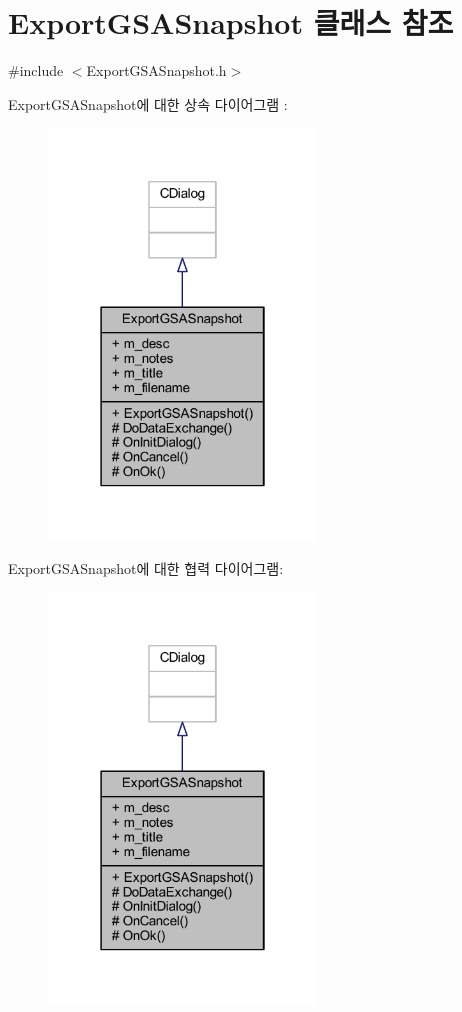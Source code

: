 \hypertarget{class_export_g_s_a_snapshot}{}\section{Export\+G\+S\+A\+Snapshot 클래스 참조}
\label{class_export_g_s_a_snapshot}


{\ttfamily \#include $<$Export\+G\+S\+A\+Snapshot.\+h$>$}



Export\+G\+S\+A\+Snapshot에 대한 상속 다이어그램 \+: \nopagebreak
\begin{figure}[H]
\begin{center}
\leavevmode
\includegraphics[width=202pt]{class_export_g_s_a_snapshot__inherit__graph}
\end{center}
\end{figure}


Export\+G\+S\+A\+Snapshot에 대한 협력 다이어그램\+:\nopagebreak
\begin{figure}[H]
\begin{center}
\leavevmode
\includegraphics[width=202pt]{class_export_g_s_a_snapshot__coll__graph}
\end{center}
\end{figure}
